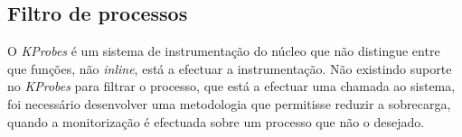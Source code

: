 \subsection{Filtro de processos}







O \textit{KProbes} é um sistema de instrumentação do núcleo que não distingue entre que funções, não \textit{inline}, está a efectuar a instrumentação.
Não existindo suporte no \textit{KProbes} para filtrar o processo, que está a efectuar uma chamada ao sistema, foi necessário desenvolver uma metodologia que permitisse reduzir a sobrecarga, quando a monitorização é efectuada sobre um processo que não o desejado.




